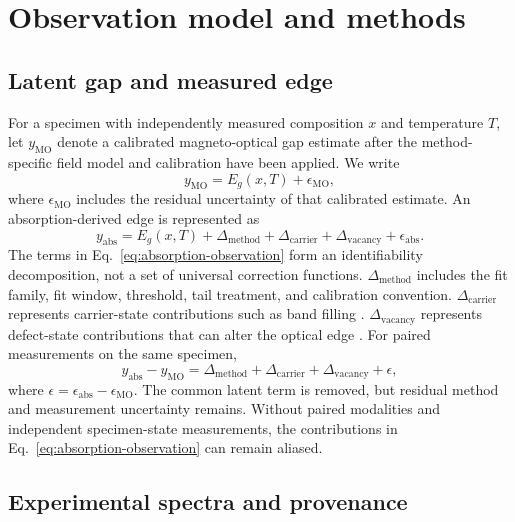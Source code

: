 \section{Observation model and methods}
\label{sec:methods}

\subsection{Latent gap and measured edge}
\label{sec:observation-model}

For a specimen with independently measured composition $x$ and temperature $T$, let $y_{\mathrm{MO}}$ denote a calibrated magneto-optical gap estimate after the method-specific field model and calibration have been applied. We write
\begin{equation}
  y_{\mathrm{MO}} = E_g(x,T) + \epsilon_{\mathrm{MO}},
  \label{eq:magneto-optical}
\end{equation}
where $\epsilon_{\mathrm{MO}}$ includes the residual uncertainty of that calibrated estimate. An absorption-derived edge is represented as
\begin{equation}
  y_{\mathrm{abs}} = E_g(x,T)
  + \Delta_{\mathrm{method}}
  + \Delta_{\mathrm{carrier}}
  + \Delta_{\mathrm{vacancy}}
  + \epsilon_{\mathrm{abs}}.
  \label{eq:absorption-observation}
\end{equation}
The terms in Eq.~\eqref{eq:absorption-observation} form an identifiability decomposition, not a set of universal correction functions. $\Delta_{\mathrm{method}}$ includes the fit family, fit window, threshold, tail treatment, and calibration convention. $\Delta_{\mathrm{carrier}}$ represents carrier-state contributions such as band filling \cite{Sarusi1989}. $\Delta_{\mathrm{vacancy}}$ represents defect-state contributions that can alter the optical edge \cite{Yue2006}. For paired measurements on the same specimen,
\begin{equation}
  y_{\mathrm{abs}} - y_{\mathrm{MO}}
  = \Delta_{\mathrm{method}} + \Delta_{\mathrm{carrier}}
  + \Delta_{\mathrm{vacancy}} + \epsilon,
  \label{eq:paired-difference}
\end{equation}
where $\epsilon=\epsilon_{\mathrm{abs}}-\epsilon_{\mathrm{MO}}$. The common latent term is removed, but residual method and measurement uncertainty remains. Without paired modalities and independent specimen-state measurements, the contributions in Eq.~\eqref{eq:absorption-observation} can remain aliased.

\subsection{Experimental spectra and provenance}
\label{sec:spectra}

